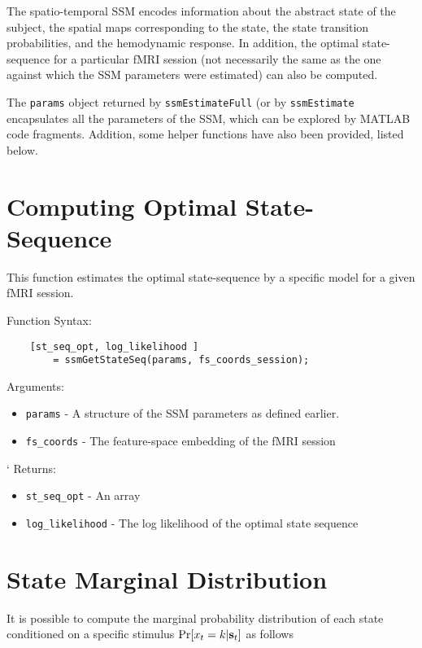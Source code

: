 
The spatio-temporal SSM encodes information about the abstract state
of the subject, the spatial maps corresponding to the state, the
state transition probabilities, and the hemodynamic response. In
addition, the optimal state-sequence for a particular fMRI session
(not necessarily the same as the one against which the SSM
parameters were estimated) can also be computed.

The \verb"params" object returned by \verb"ssmEstimateFull" (or by
\verb"ssmEstimate" encapsulates all the parameters of the SSM, which
can be explored by MATLAB code fragments. Addition, some helper
functions have also been provided, listed below.


\section{Computing Optimal State-Sequence}

This function estimates the optimal state-sequence by a specific
model for a given fMRI session.

Function Syntax:
\begin{verbatim}
    [st_seq_opt, log_likelihood ]
        = ssmGetStateSeq(params, fs_coords_session);
\end{verbatim}
Arguments:
\begin{itemize}
  \item \verb"params" - A structure of the SSM parameters as
  defined earlier.
  \item \verb"fs_coords" - The feature-space embedding of the fMRI session
\end{itemize}`
Returns:
\begin{itemize}
    \item \verb"st_seq_opt" - An array
    \item \verb"log_likelihood" - The log likelihood of the optimal
    state sequence
\end{itemize}


\section{State Marginal Distribution}
It is possible to compute the marginal probability distribution of
each state conditioned on a specific stimulus $\Pr[{x}_t = k | {\mathbf{s}}_t]$
as follows

